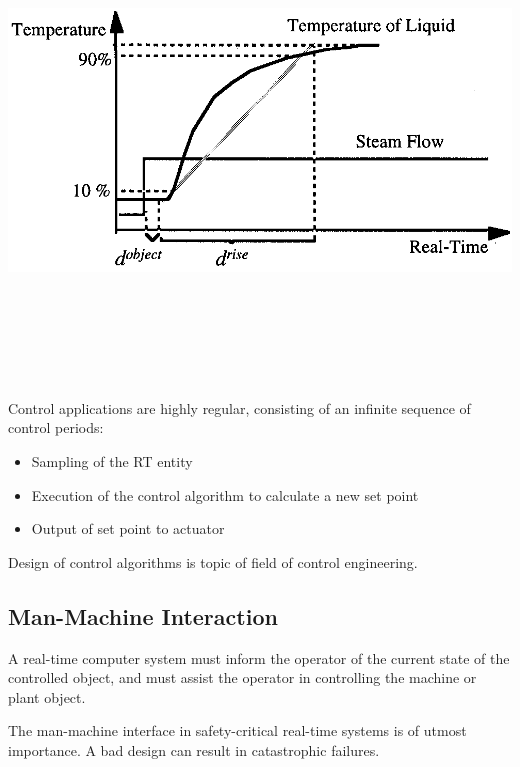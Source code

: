 \includegraphics[width=6.85069in,height=5.00278in]{media/Fig_1_4.png}

Control applications are highly regular, consisting of an infinite
sequence of control periods:

\begin{itemize}
\item
  Sampling of the RT entity
\item
  Execution of the control algorithm to calculate a new set point
\item
  Output of set point to actuator
\end{itemize}

Design of control algorithms is topic of field of control engineering.

\subsection{Man-Machine Interaction}\label{man-machine-interaction}

A real-time computer system must inform the operator of the current
state of the controlled object, and must assist the operator in
controlling the machine or plant object.

The man-machine interface in safety-critical real-time systems is of
utmost importance. A bad design can result in catastrophic failures.

